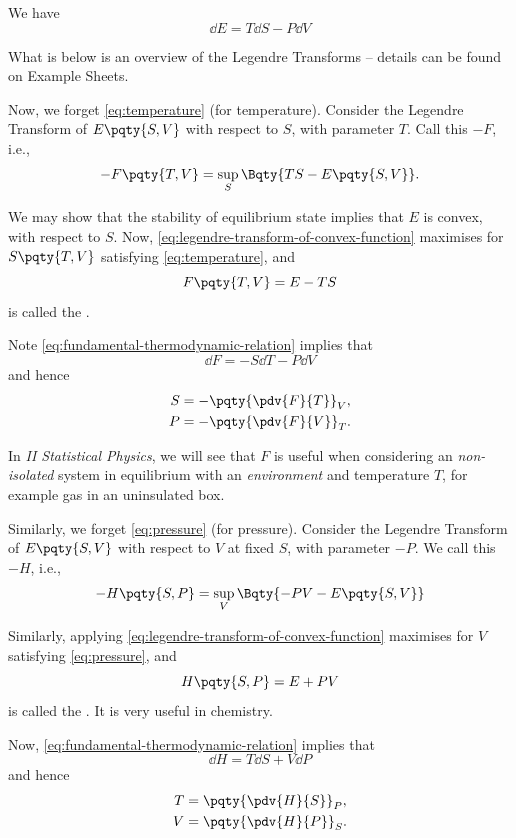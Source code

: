 \begin{proposition}
    We have
    \begin{equation}
        \label{eq:fundamental-thermodynamic-relation}%
        \dd{E} = T \dd{S} - P \dd{V}
    \end{equation}
\end{proposition}

What is below is an overview of the Legendre Transforms -- details can be found on Example Sheets.

\begin{example}
    Now, we forget \eqref{eq:temperature} (for temperature). Consider the Legendre Transform of \(E\pqty{S, V}\) with respect to \(S\), with parameter \(T\). Call this \(-F\), i.e.,
    \[
        -F \pqty{T, V} = \sup_{S} \Bqty{TS - E \pqty{S, V}}.
    \] 

    We may show that the stability of equilibrium state implies that \(E\) is convex, with respect to \(S\). Now, \eqref{eq:legendre-transform-of-convex-function} maximises for \(S\pqty{T, V}\) satisfying \eqref{eq:temperature}, and
    \[
        F\pqty{T, V} = E - TS
    \]
    is called the .

    Note \eqref{eq:fundamental-thermodynamic-relation} implies that
    \[
        \dd{F} = - S \dd{T} - P \dd{V}
    \]
    and hence
    \begin{align*}
        S &= - \pqty{\pdv{F}{T}}_{V}, \\
        P &= - \pqty{\pdv{F}{V}}_{T}.
    \end{align*}

    In \textit{II Statistical Physics}, we will see that \(F\) is useful when considering an \emph{non-isolated} system in equilibrium with an \emph{environment} and temperature \(T\), for example gas in an uninsulated box.
\end{example}

\begin{example}
    Similarly, we forget \eqref{eq:pressure} (for pressure). Consider the Legendre Transform of \(E\pqty{S, V}\) with respect to \(V\) at fixed \(S\), with parameter \(-P\). We call this \(-H\), i.e.,
    \[
        -H \pqty{S, P} = \sup_{V} \Bqty{-PV - E \pqty{S, V}}
    \]

    Similarly, applying \eqref{eq:legendre-transform-of-convex-function} maximises for \(V\) satisfying \eqref{eq:pressure}, and
    \[
        H\pqty{S, P} = E + PV
    \]
    is called the . It is very useful in chemistry.

    Now, \eqref{eq:fundamental-thermodynamic-relation} implies that
    \[
        \dd{H} = T \dd{S} + V \dd{P}
    \]
    and hence
    \begin{align*}
        T &= \pqty{\pdv{H}{S}}_{P}, \\
        V &= \pqty{\pdv{H}{P}}_{S}.
    \end{align*}
\end{example}

